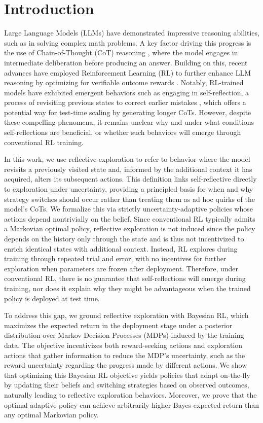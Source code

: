 \vspace{-0.4cm}
\section{Introduction}
Large Language Models (LLMs) have demonstrated impressive reasoning abilities, such as in solving complex math problems. A key factor driving this progress is the use of Chain-of-Thought (CoT) reasoning \citep{wei2022chain}, where the model engages in intermediate deliberation before producing an answer. Building on this, recent advances have employed Reinforcement Learning (RL) to further enhance LLM reasoning by optimizing for verifiable outcome rewards \citep{jaech2024openai, guo2025deepseek, yu2025dapo, wei2025swe}. Notably, RL-trained models have exhibited emergent behaviors such as engaging in self-reflection, a process of revisiting previous states to correct earlier mistakes \citep{guo2025deepseek, zeng2025simplerl}, which offers a potential way for test-time scaling \citep{snell2024scaling,brown2024large} by generating longer CoTs. However, despite these compelling phenomena, it remains unclear why and under what conditions self-reflections are beneficial, or whether such behaviors will emerge through conventional RL training.

In this work, we use reflective exploration to refer to behavior where the model revisits a previously visited state and, informed by the additional context it has acquired, alters its subsequent actions. This definition links self-reflective directly to exploration under uncertainty, providing a principled basis for when and why strategy switches should occur rather than treating them as ad hoc quirks of the model’s CoTs. We formalize this via strictly uncertainty-adaptive policies whose actions depend nontrivially on the belief. Since conventional RL typically admits a Markovian optimal policy, reflective exploration is not induced since the policy depends on the history only through the state and is thus not incentivized to enrich identical states with additional context.
Instead, RL explores during training through repeated trial and error, with no incentives for further exploration when parameters are frozen after deployment. Therefore, under conventional RL, there is no guarantee that self-reflections will emerge during training, nor does it explain why they might be advantageous when the trained policy is deployed at test time.

To address this gap, we ground reflective exploration with Bayesian RL, which maximizes the expected return in the deployment stage under a posterior distribution over Markov Decision Processes (MDPs) induced by the training data. The objective incentivizes both reward-seeking actions and exploration actions that gather information to reduce the MDP's uncertainty, such as the reward uncertainty regarding the progress made by different actions. 
We show that optimizing this Bayesian RL objective yields policies that adapt on-the-fly by updating their beliefs and switching strategies based on observed outcomes, naturally leading to reflective exploration behaviors. Moreover, we prove that the optimal adaptive policy can achieve arbitrarily higher Bayes-expected return than any optimal Markovian policy.

